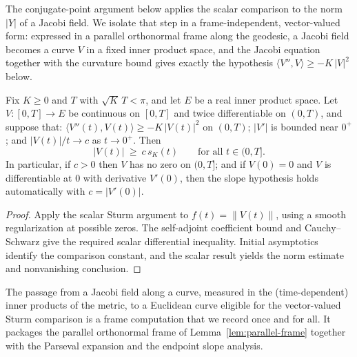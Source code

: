 The conjugate-point argument below applies the scalar comparison to
the norm $|Y|$ of a Jacobi field. We isolate that step in a
frame-independent, vector-valued form: expressed in a parallel
orthonormal frame along the geodesic, a Jacobi field becomes a curve
$V$ in a fixed inner product space, and the Jacobi equation together
with the curvature bound gives exactly the hypothesis
$\langle V'',V\rangle\ge-K\,|V|^2$ below.

\begin{lemma}
\label{lem:vector-sturm-comparison}
\leanok



Fix $K\ge0$ and $T$ with $\sqrt K\,T<\pi$, and let $E$ be a real
inner product space. Let $V\colon[0,T]\to E$ be continuous on
$[0,T]$ and twice differentiable on $(0,T)$, and suppose that:
$\langle V''(t),V(t)\rangle\ge-K\,|V(t)|^2$ on $(0,T)$; $|V'|$ is
bounded near $0^+$; and $|V(t)|/t\to c$ as $t\to0^+$. Then
$$|V(t)|\ \ge\ c\,s_K(t)\qquad\text{for all }t\in(0,T].$$
In particular, if $c>0$ then $V$ has no zero on $(0,T]$; and if
$V(0)=0$ and $V$ is differentiable at $0$ with derivative $V'(0)$,
then the slope hypothesis holds automatically with $c=|V'(0)|$.
\end{lemma}

\begin{proof}
\sketch
{}
\leanok
Apply the scalar Sturm argument to $f(t)=\|V(t)\|$, using a smooth regularization at possible zeros. The self-adjoint coefficient bound and Cauchy--Schwarz give the required scalar differential inequality. Initial asymptotics identify the comparison constant, and the scalar result yields the norm estimate and nonvanishing conclusion.
\end{proof}

The passage from a Jacobi field along a curve, measured in the
(time-dependent) inner products of the metric, to a Euclidean curve
eligible for the vector-valued Sturm comparison is a frame computation
that we record once and for all. It packages the parallel orthonormal
frame of Lemma~\ref{lem:parallel-frame} together with the Parseval
expansion and the endpoint slope analysis.

